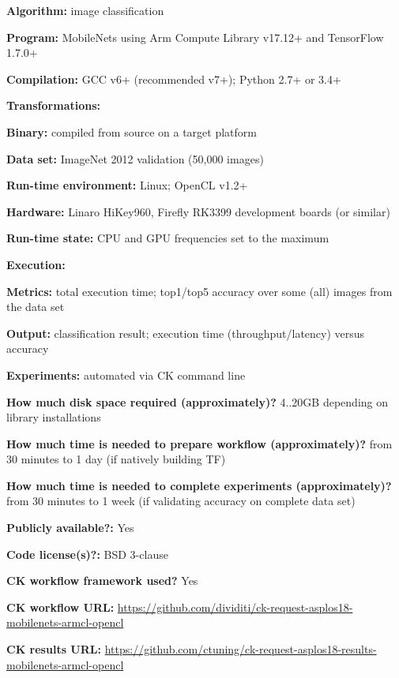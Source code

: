 \begin{packed_itemize}
  \item {\bf Algorithm:} image classification
  \item {\bf Program:} MobileNets using Arm Compute Library v17.12+ and TensorFlow 1.7.0+
  \item {\bf Compilation:} GCC v6+ (recommended v7+); Python 2.7+ or 3.4+
  \item {\bf Transformations:}
  \item {\bf Binary:} compiled from source on a target platform
  \item {\bf Data set:} ImageNet 2012 validation (50,000 images)
  \item {\bf Run-time environment:} Linux; OpenCL v1.2+
  \item {\bf Hardware:} Linaro HiKey960, Firefly RK3399 development boards (or similar)
  \item {\bf Run-time state:} CPU and GPU frequencies set to the maximum
  \item {\bf Execution:} 
  \item {\bf Metrics:} total execution time; top1/top5 accuracy over some (all) images from the data set
  \item {\bf Output:} classification result; execution time (throughput/latency) versus accuracy
  \item {\bf Experiments:} automated via CK command line
  \item {\bf How much disk space required (approximately)?} 4..20GB depending on library installations
  \item {\bf How much time is needed to prepare workflow (approximately)?} from 30 minutes to 1 day (if natively building TF)
  \item {\bf How much time is needed to complete experiments (approximately)?} from 30 minutes to 1 week (if validating accuracy on complete data set)
  \item {\bf Publicly available?:} Yes
  \item {\bf Code license(s)?:} BSD 3-clause
  \item {\bf CK workflow framework used?} Yes
  \item {\bf CK workflow URL:} \url{https://github.com/dividiti/ck-request-asplos18-mobilenets-armcl-opencl}
  \item {\bf CK results URL:} \url{https://github.com/ctuning/ck-request-asplos18-results-mobilenets-armcl-opencl}
\end{packed_itemize}

